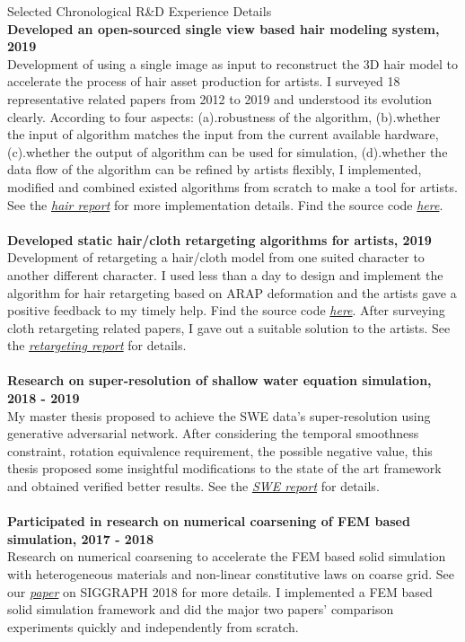 \documentclass{resume} %
\begin{document}
\begin{rSection}{Selected Chronological R\&D Experience Details}
  \\{\bf Developed an open-sourced single view based hair modeling system, 2019}\\ Development of using a single image as input to reconstruct the 3D hair model to accelerate the process of hair asset production for artists. I surveyed 18 representative related papers from 2012 to 2019 and understood its evolution clearly. According to four aspects: (a).robustness of the algorithm, (b).whether the input of algorithm matches the input from the current available hardware, (c).whether the output of algorithm can be used for simulation, (d).whether the data flow of the algorithm can be refined by artists flexibly, I implemented, modified and combined existed algorithms from scratch to make a tool for artists. See the \emph{\href{https://wtyatzoo.github.io/reports/hair.pdf}{hair report}} for more implementation details. Find the source code \emph{\href{https://github.com/WTYatzoo/hair\_modeling}{here}}.\\
  \\{\bf Developed static hair/cloth retargeting algorithms for artists, 2019}\\ Development of retargeting a hair/cloth model from one suited character to another different character. I used less than a day to design and implement the algorithm for hair retargeting based on ARAP deformation and the artists gave a positive feedback to my timely help. Find the source code \emph{\href{https://github.com/WTYatzoo/hair\_retargeting}{here}}. After surveying cloth retargeting related papers, I gave out a suitable solution to the artists. See the \emph{\href{https://wtyatzoo.github.io/reports/retargeting.pdf}{retargeting report}} for details.\\
  \\{\bf Research on super-resolution of shallow water equation simulation, 2018 - 2019}\\ My master thesis proposed to achieve the SWE data's super-resolution using generative adversarial network. After considering the temporal smoothness constraint, rotation equivalence requirement, the possible negative value, this thesis proposed some insightful modifications to the state of the art framework and obtained verified better results. See the \emph{\href{https://wtyatzoo.github.io/reports/SWE.pdf}{SWE report}} for details. \\
  \\{\bf Participated in research on numerical coarsening of FEM based simulation, 2017 - 2018}\\ Research on numerical coarsening to accelerate the FEM based solid simulation with heterogeneous materials and non-linear constitutive laws on coarse grid. See our \emph{\href{https://wtyatzoo.github.io/peer\_reviewed/opt\_basis\_18.pdf}{paper}} on SIGGRAPH 2018 for more details. I implemented a FEM based solid simulation framework and did the major two papers' comparison experiments quickly and independently from scratch.\\
\end{rSection}
\end{document}
